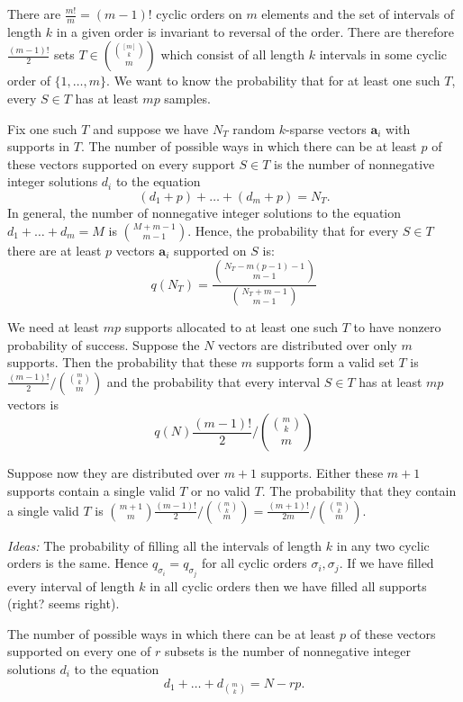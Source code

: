 \documentclass[journal, onecolumn]{IEEEtran}
\begin{document}
There are $\frac{m!}{m} = (m-1)!$ cyclic orders on $m$ elements and the set of intervals of length $k$ in a given order is invariant to reversal of the order. There are therefore $\frac{(m-1)!}{2}$ sets $T \in { {[m] \choose k} \choose m}$ which consist of all length $k$ intervals in some cyclic order of $\{1, \ldots, m\}$. We want to know the probability that for at least one such $T$, every $S \in T$ has at least $mp$ samples.

Fix one such $T$ and suppose we have $N_T$ random $k$-sparse vectors $\mathbf{a}_i$ with supports in $T$. The number of possible ways in which there can be at least $p$ of these vectors supported on every support $S \in T$ is the number of nonnegative integer solutions $d_i$ to the equation
\[ (d_1 + p) + \ldots + (d_m + p) = N_T.\]
%
In general, the number of nonnegative integer solutions to the equation $d_1 + \ldots + d_m = M$ is ${M+m-1 \choose m-1}$. Hence, the probability that for every $S \in T$ there are at least $p$ vectors $\mathbf{a}_i$ supported on $S$ is:
\[ q(N_T) = \frac{ { N_T-m(p-1)-1 \choose m-1 } }{ {N_T+m-1 \choose m-1} } \]

We need at least $mp$ supports allocated to at least one such $T$ to have nonzero probability of success. Suppose the $N$ vectors are distributed over only $m$ supports. Then the probability that these $m$ supports form a valid set $T$ is $\frac{(m-1)!}{2} / { {m \choose k} \choose m}$ and the probability that every interval $S \in T$ has at least $mp$ vectors is 
\[ q(N) \frac{(m-1)!}{2} / { {m \choose k} \choose m}\]

Suppose now they are distributed over $m+1$ supports. Either these $m+1$ supports contain a single valid $T$ or no valid $T$. The probability that they contain a single valid $T$ is ${m+1 \choose m} \frac{(m-1)!}{2} / { {m \choose k} \choose m} = \frac{(m+1)!}{2m} / { {m \choose k} \choose m}$.

\emph{Ideas:} The probability of filling all the intervals of length $k$ in any two cyclic orders is the same. Hence $q_{\sigma_i} = q_{\sigma_j}$ for all cyclic orders $\sigma_i, \sigma_j$. If we have filled every interval of length $k$ in all cyclic orders then we have filled all supports (right? seems right).

The number of possible ways in which there can be at least $p$ of these vectors supported on every one of $r$ subsets is the number of nonnegative integer solutions $d_i$ to the equation
\[ d_1 + \ldots + d_{{m \choose k} }= N - rp.\]
\end{document}
